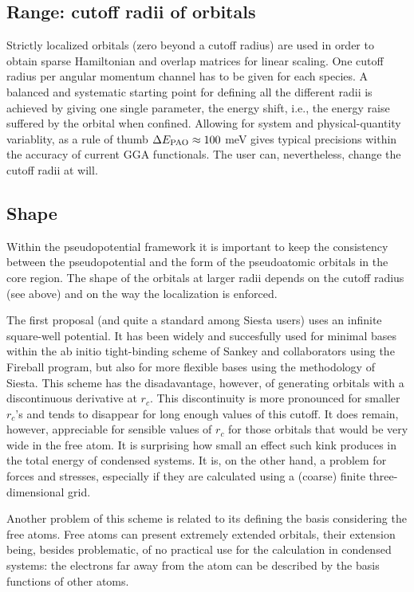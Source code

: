 \documentclass[11pt]{article}
\begin{document}
\subsection{Range: cutoff radii of orbitals}

  Strictly localized orbitals (zero beyond a cutoff radius) are used
in order to obtain sparse Hamiltonian and overlap matrices for linear 
scaling. One cutoff radius per angular momentum channel has to be
given for each species. 
  A balanced and systematic starting point for defining all the different 
radii is achieved by giving one single parameter, the energy shift, i.e., 
the energy raise suffered by the orbital when confined.
Allowing for system and physical-quantity variablity, as a rule of thumb
$\Delta E_{\small \rm PAO} \approx 100$ meV gives 
typical precisions within the accuracy of current GGA functionals.
The user can, nevertheless, change the cutoff radii at will.

\subsection{Shape}

  Within the pseudopotential framework it is important to keep 
the consistency between the pseudopotential and
the form of the pseudoatomic orbitals in the core region.
  The shape of the orbitals at larger radii depends on the
cutoff radius (see above) and on the way the localization 
is enforced.

  The first proposal (and quite a standard among {\sc Siesta}
users) uses an infinite square-well potential.
  It has been widely and succesfully used for minimal bases within 
the ab initio tight-binding scheme of Sankey and 
collaborators using the {\sc Fireball } program, but also 
for more flexible bases using the methodology of {\sc Siesta}.
  This scheme has the disadavantage, however, of generating 
orbitals with a discontinuous derivative at $r_c$. 
  This discontinuity is more pronounced for smaller $r_c$'s and
tends to disappear for long enough values of this cutoff.
  It does remain, however, appreciable for sensible values of
$r_c$ for those orbitals that would be very wide in the free atom.
  It is surprising how small an effect such kink produces in the
total energy of condensed systems.
  It is, on the other hand, a problem for forces and stresses,
especially if they are calculated using a (coarse) finite 
three-dimensional grid.

  Another problem of this scheme is related to its defining the
basis considering the free atoms. 
  Free atoms can present extremely
extended orbitals, their extension being, besides problematic,
of no practical use for the calculation in condensed systems:
the electrons far away from the atom can be described by the
basis functions of other atoms.
 
\end{document}
